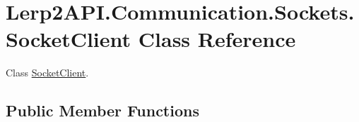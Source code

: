 \hypertarget{class_lerp2_a_p_i_1_1_communication_1_1_sockets_1_1_socket_client}{}\section{Lerp2\+A\+P\+I.\+Communication.\+Sockets.\+Socket\+Client Class Reference}
\label{class_lerp2_a_p_i_1_1_communication_1_1_sockets_1_1_socket_client}


Class \hyperlink{class_lerp2_a_p_i_1_1_communication_1_1_sockets_1_1_socket_client}{Socket\+Client}.  


\subsection*{Public Member Functions}
